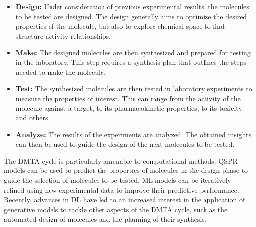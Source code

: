 \begin{itemize}
    \item \textbf{Design:} Under consideration of previous experimental results, the molecules to
          be tested are designed. The design generally aims to optimize the desired properties of
          the molecule, but also to explore chemical space to find structure-activity relationships.
    \item \textbf{Make:} The designed molecules are then synthesized and prepared for testing in
          the laboratory. This step requires a synthesis plan that outlines the steps needed to
          make the molecule.
    \item \textbf{Test:} The synthesized molecules are then tested in laboratory experiments to
          measure the properties of interest. This can range from the activity of the molecule
          against a target, to its pharmacokinetic properties, to its toxicity and others.
    \item \textbf{Analyze:} The results of the experiments are analyzed. The obtained insights
          can then be used to guide the design of the next molecules to be tested.
\end{itemize}

The \ac{DMTA} cycle is particularly amenable to computational methods. \Ac{QSPR} models can be used
to predict the properties of molecules in the design phase to guide the selection of molecules
to be tested. \Ac{ML} models can be iteratively refined using new experimental data to
improve their predictive performance. Recently, advances in \ac{DL} have led to an increased
interest in the application of generative models to tackle other aspects of the \ac{DMTA} cycle,
such as the automated design of molecules and the planning of their synthesis.

